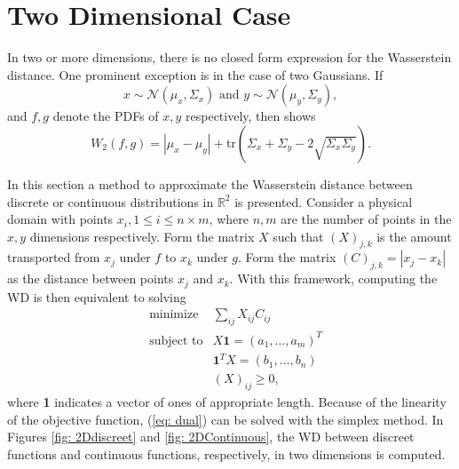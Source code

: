 \documentclass[10pt]{article}
\begin{document}
\section{Two Dimensional Case}
\label{sec: TwoD}

In two or more dimensions, there is no closed form expression for the Wasserstein distance. One prominent exception is in the case of two Gaussians. If 
\begin{equation}
x \sim \mathcal{N}(\mu_x, \Sigma_x) \text{   and   } y \sim \mathcal{N}(\mu_y, \Sigma_y), 
\end{equation}
and $f, g$ denote the PDFs of $x, y$ respectively, then \cite{Downson}  shows 
\begin{equation}
W_2(f, g) = |\mu_x - \mu_y| +\text{tr}(\Sigma_x + \Sigma_y - 2\sqrt{\Sigma_x\Sigma_y}).
\end{equation}

\noindent In this section a method to approximate the Wasserstein distance between discrete or continuous distributions in $\mathbb{R}^2$ is presented. Consider a physical domain with points $x_{i}, 1 \leq i \leq n \times m$, where $n, m$ are the number of points in the $x, y$ dimensions respectively. Form the matrix $X$ such that $(X)_{j, k}$ is the amount transported from $x_j$ under $f$ to $x_k$ under $g$. Form the matrix $(C)_{j, k} = |x_j - x_k|$ as the distance between points $x_j$ and $x_k.$  With this framework, computing the WD is then equivalent to solving 
\begin{equation}
\begin{aligned}
& {\text{minimize}}
& \sum_{ij}X_{ij}C_{ij} \\
& \text{subject to}
& X\textbf{1} = (a_1, \dotsc, a_m)^{T} \\ 
& & \textbf{1}^{T}X = (b_1, \dotsc, b_n)\\
& & (X)_{ij} \geq 0,
\end{aligned}
\label{eq: dual}
\end{equation}
where \textbf{1} indicates a vector of ones of appropriate length. Because of the linearity of the objective function, (\ref{eq: dual}) can be solved with the simplex method. In Figures \ref{fig: 2Ddiscreet} and \ref{fig: 2DContinuous}, the WD between discreet functions and continuous functions, respectively, in two dimensions is computed.
 
\end{document}
